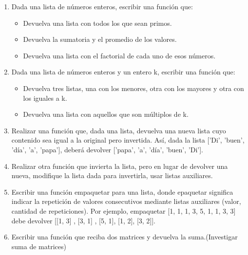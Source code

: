 \documentclass[11pt,twoside,a4paper]{article}
\begin{document}
	\begin{enumerate}

		\item Dada una lista de números enteros, escribir una función que:

			\begin{itemize}

			    \item Devuelva una lista con todos los que sean primos.

			    \item Devuelva la sumatoria y el promedio de los valores.

			    \item Devuelva una lista con el factorial de cada uno de esos números.

			\end{itemize}

		\item Dada una lista de números enteros y un entero k, escribir una función que:

			\begin{itemize}

				\item   Devuelva tres listas, una con los menores, otra con los mayores y otra con los iguales a k.

				\item   Devuelva una lista con aquellos que son múltiplos de k.
				
			\end{itemize}

		\item Realizar una función que, dada una lista, devuelva una nueva lista cuyo contenido sea igual a la original pero invertida. Así, dada la lista [’Di’, ’buen’, ’día’, ’a’, ’papa’], deberá devolver [’papa’, ’a’, ’día’, ’buen’, ’Di’].

		\item Realizar otra función que invierta la lista, pero en lugar de devolver una nueva, modifique la lista dada para invertirla, usar listas auxiliares.

		\item Escribir una función empaquetar para una lista, donde epaquetar significa indicar la repetición de valores consecutivos mediante listas auxiliares (valor, cantidad de repeticiones). Por ejemplo, empaquetar [1, 1, 1, 3, 5, 1, 1, 3, 3] debe devolver [[1, 3] , [3, 1] , [5, 1], [1, 2], [3, 2]].

		\item Escribir una función que reciba dos matrices y devuelva la suma.(Investigar suma de matrices)


\end{enumerate}
\end{document}
